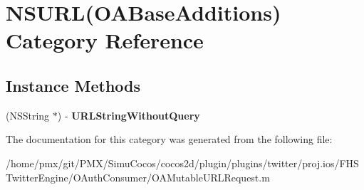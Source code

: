 \hypertarget{categoryNSURL_07OABaseAdditions_08}{}\section{N\+S\+U\+RL(O\+A\+Base\+Additions) Category Reference}
\label{categoryNSURL_07OABaseAdditions_08}
\subsection*{Instance Methods}
\begin{DoxyCompactItemize}
\item 
\mbox{\label{categoryNSURL_07OABaseAdditions_08_abd2477854cbcb95f65ea9b1deabcd2fe}} 
(N\+S\+String $\ast$) -\/ {\bfseries U\+R\+L\+String\+Without\+Query}
\end{DoxyCompactItemize}


The documentation for this category was generated from the following file\+:\begin{DoxyCompactItemize}
\item 
/home/pmx/git/\+P\+M\+X/\+Simu\+Cocos/cocos2d/plugin/plugins/twitter/proj.\+ios/\+F\+H\+S\+Twitter\+Engine/\+O\+Auth\+Consumer/O\+A\+Mutable\+U\+R\+L\+Request.\+m\end{DoxyCompactItemize}
